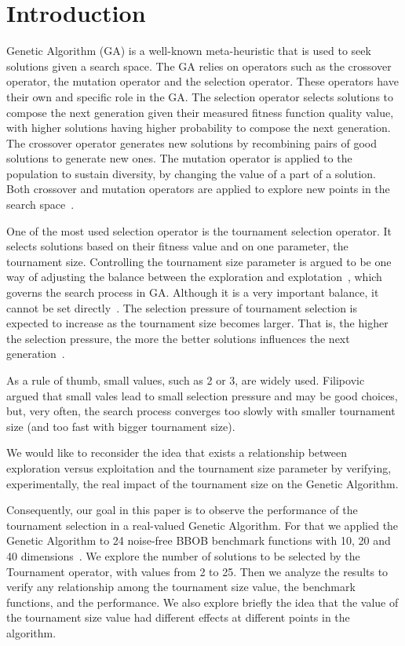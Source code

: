 \section{Introduction}\label{intro}

 Genetic Algorithm (GA) is a well-known meta-heuristic that is used to seek solutions given a search space. The GA relies on operators such as the crossover operator, the mutation operator and the selection operator. These operators have their own and specific role in the GA. The selection operator selects solutions to compose the next generation given their measured fitness function quality value, with higher solutions having higher probability to compose the next generation. The crossover operator generates new solutions by recombining pairs of good solutions to generate new ones. The mutation operator is applied to the population to sustain diversity, by changing the value of a part of a solution. Both crossover and mutation operators are applied to explore new points in the search space~\cite{blickle1995mathematical}.

One of the most used selection operator is the tournament selection operator. It selects solutions based on their fitness value and on one parameter, the tournament size. Controlling the tournament size parameter is argued to be one way of adjusting the balance between the exploration and explotation~\cite{blickle1995mathematical}, which governs the search process in GA. Although it is a very important balance, it cannot be set directly~\cite{filipovic2012fine}. The selection pressure of tournament selection is expected to increase as the tournament size becomes larger. That is, the higher the selection pressure, the more the better solutions influences the next generation~\cite{miller1995genetic}. 

As a rule of thumb, small values, such as 2 or 3, are widely used. Filipovic~\cite{filipovic2012fine} argued that small vales lead to small selection pressure and may be good choices, but, very often, the search process converges too slowly with smaller tournament size (and too fast with bigger tournament size). 

 We would like to reconsider the idea that exists a relationship between exploration versus exploitation and the tournament size parameter by verifying, experimentally, the real impact of the tournament size on the Genetic Algorithm.
 
 Consequently, our goal in this paper is to observe the performance of the tournament selection in a real-valued Genetic Algorithm. For that we applied the Genetic Algorithm to 24 noise-free BBOB benchmark functions with 10, 20 and 40 dimensions~\cite{hansen2010real}. We explore the number of solutions to be selected by the Tournament operator, with values from 2 to 25. Then we analyze the results to verify any relationship among the tournament size value, the benchmark functions, and the performance. We also explore briefly the idea that the value of the tournament size value had different effects at different points in the algorithm.

